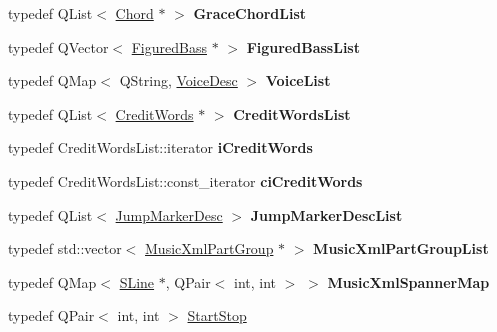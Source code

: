 \begin{DoxyCompactItemize}
typedef Q\+List$<$ \hyperlink{class_ms_1_1_chord}{Chord} $\ast$ $>$ {\bfseries Grace\+Chord\+List}
\item 
\mbox{\label{namespace_ms_acbc536218112ecaa5b325137b0d7a150}} 
typedef Q\+Vector$<$ \hyperlink{class_ms_1_1_figured_bass}{Figured\+Bass} $\ast$ $>$ {\bfseries Figured\+Bass\+List}
\item 
\mbox{\label{namespace_ms_a81dc4c67664fb67a164fa58735aab7d8}} 
typedef Q\+Map$<$ Q\+String, \hyperlink{class_ms_1_1_voice_desc}{Voice\+Desc} $>$ {\bfseries Voice\+List}
\item 
\mbox{\label{namespace_ms_a5ad1a2215eb018f12419206aec4cb2c3}} 
typedef Q\+List$<$ \hyperlink{struct_ms_1_1_credit_words}{Credit\+Words} $\ast$ $>$ {\bfseries Credit\+Words\+List}
\item 
\mbox{\label{namespace_ms_a78abbdb729294e16c5d1597bfeb85d9e}} 
typedef Credit\+Words\+List\+::iterator {\bfseries i\+Credit\+Words}
\item 
\mbox{\label{namespace_ms_a606153754be510cc1be5d952b83b79d3}} 
typedef Credit\+Words\+List\+::const\+\_\+iterator {\bfseries ci\+Credit\+Words}
\item 
\mbox{\label{namespace_ms_a3e71438c5b78bbd0726b6cce935f2290}} 
typedef Q\+List$<$ \hyperlink{class_ms_1_1_jump_marker_desc}{Jump\+Marker\+Desc} $>$ {\bfseries Jump\+Marker\+Desc\+List}
\item 
\mbox{\label{namespace_ms_aa7743fb4725744a5c3d0fbc939e96c66}} 
typedef std\+::vector$<$ \hyperlink{struct_ms_1_1_music_xml_part_group}{Music\+Xml\+Part\+Group} $\ast$ $>$ {\bfseries Music\+Xml\+Part\+Group\+List}
\item 
\mbox{\label{namespace_ms_a0c4f9f817f0112329f4f97d8c2f9d8e2}} 
typedef Q\+Map$<$ \hyperlink{class_ms_1_1_s_line}{S\+Line} $\ast$, Q\+Pair$<$ int, int $>$ $>$ {\bfseries Music\+Xml\+Spanner\+Map}
\item 
typedef Q\+Pair$<$ int, int $>$ \hyperlink{namespace_ms_a53322ca7de949b92f493bb3b6a5fc202}{Start\+Stop}
\item 
\mbox{\label{namespace_ms_ac4445aa63d9807a20db60abc7a6f77b9}} 

\end{DoxyCompactItemize}
